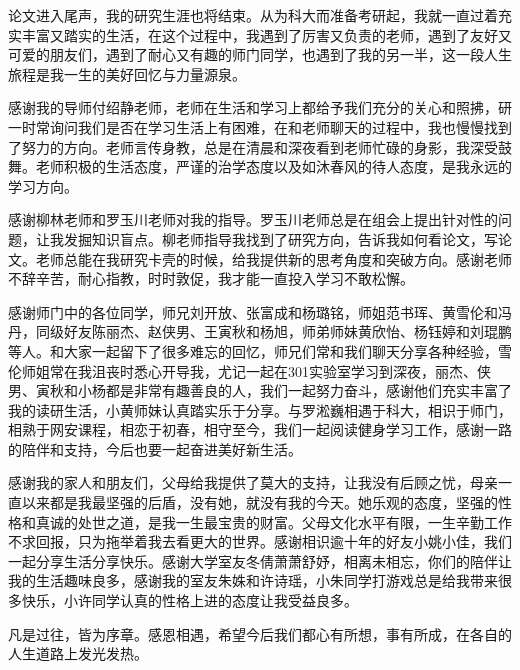 

\begin{ack}
论文进入尾声，我的研究生涯也将结束。从为科大而准备考研起，我就一直过着充实丰富又踏实的生活，在这个过程中，我遇到了厉害又负责的老师，遇到了友好又可爱的朋友们，遇到了耐心又有趣的师门同学，也遇到了我的另一半，这一段人生旅程是我一生的美好回忆与力量源泉。

感谢我的导师付绍静老师，老师在生活和学习上都给予我们充分的关心和照拂，研一时常询问我们是否在学习生活上有困难，在和老师聊天的过程中，我也慢慢找到了努力的方向。老师言传身教，总是在清晨和深夜看到老师忙碌的身影，我深受鼓舞。老师积极的生活态度，严谨的治学态度以及如沐春风的待人态度，是我永远的学习方向。

感谢柳林老师和罗玉川老师对我的指导。罗玉川老师总是在组会上提出针对性的问题，让我发掘知识盲点。柳老师指导我找到了研究方向，告诉我如何看论文，写论文。老师总能在我研究卡壳的时候，给我提供新的思考角度和突破方向。感谢老师不辞辛苦，耐心指教，时时敦促，我才能一直投入学习不敢松懈。

感谢师门中的各位同学，师兄刘开放、张富成和杨璐铭，师姐范书珲、黄雪伦和冯丹，同级好友陈丽杰、赵侠男、王寅秋和杨旭，师弟师妹黄欣怡、杨钰婷和刘琨鹏等人。和大家一起留下了很多难忘的回忆，师兄们常和我们聊天分享各种经验，雪伦师姐常在我沮丧时悉心开导我，尤记一起在301实验室学习到深夜，丽杰、侠男、寅秋和小杨都是非常有趣善良的人，我们一起努力奋斗，感谢他们充实丰富了我的读研生活，小黄师妹认真踏实乐于分享。与罗淞巍相遇于科大，相识于师门，相熟于网安课程，相恋于初春，相守至今，我们一起阅读健身学习工作，感谢一路的陪伴和支持，今后也要一起奋进美好新生活。

感谢我的家人和朋友们，父母给我提供了莫大的支持，让我没有后顾之忧，母亲一直以来都是我最坚强的后盾，没有她，就没有我的今天。她乐观的态度，坚强的性格和真诚的处世之道，是我一生最宝贵的财富。父母文化水平有限，一生辛勤工作不求回报，只为拖举着我去看更大的世界。感谢相识逾十年的好友小姚小佳，我们一起分享生活分享快乐。感谢大学室友冬倩萧萧舒妤，相离未相忘，你们的陪伴让我的生活趣味良多，感谢我的室友朱姝和许诗瑶，小朱同学打游戏总是给我带来很多快乐，小许同学认真的性格上进的态度让我受益良多。

凡是过往，皆为序章。感恩相遇，希望今后我们都心有所想，事有所成，在各自的人生道路上发光发热。
\end{ack}
